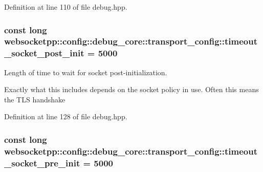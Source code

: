 Definition at line 110 of file debug.\+hpp.

\subsubsection[{\texorpdfstring{timeout\+\_\+socket\+\_\+post\+\_\+init}{timeout\_socket\_post\_init}}]{\setlength{\rightskip}{0pt plus 5cm}const long websocketpp\+::config\+::debug\+\_\+core\+::transport\+\_\+config\+::timeout\+\_\+socket\+\_\+post\+\_\+init = 5000\hspace{0.3cm}{\ttfamily [static]}}\hypertarget{structwebsocketpp_1_1config_1_1debug__core_1_1transport__config_ad2a5a0b0dcc45899356e0ba7df49860d}{}\label{structwebsocketpp_1_1config_1_1debug__core_1_1transport__config_ad2a5a0b0dcc45899356e0ba7df49860d}


Length of time to wait for socket post-\/initialization. 

Exactly what this includes depends on the socket policy in use. Often this means the T\+LS handshake 

Definition at line 128 of file debug.\+hpp.

\subsubsection[{\texorpdfstring{timeout\+\_\+socket\+\_\+pre\+\_\+init}{timeout\_socket\_pre\_init}}]{\setlength{\rightskip}{0pt plus 5cm}const long websocketpp\+::config\+::debug\+\_\+core\+::transport\+\_\+config\+::timeout\+\_\+socket\+\_\+pre\+\_\+init = 5000\hspace{0.3cm}{\ttfamily [static]}}\hypertarget{structwebsocketpp_1_1config_1_1debug__core_1_1transport__config_a4935338debd7b6e1434a471c94d8abda}{}\label{structwebsocketpp_1_1config_1_1debug__core_1_1transport__config_a4935338debd7b6e1434a471c94d8abda}


